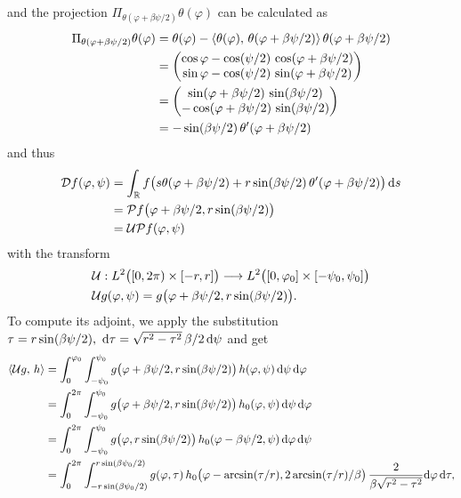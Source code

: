 \documentclass{amsart}
\renewcommand*{\phi}{\varphi}
\begin{document}
%
and the projection $\Pi_{\theta(\phi + \beta\psi/2)}\theta(\phi)$ can be calculated as
%
\begin{align*}
 \Pi_{\theta(\phi + \beta\psi/2)}\theta(\phi)
 &= \theta(\phi) - \INNER{\theta(\phi)}{\theta(\phi + \beta\psi/2)}\, \theta(\phi + \beta\psi/2) \\
 &=
 \begin{pmatrix}
  \cos\phi - \cos(\psi/2)\, \cos(\phi + \beta\psi/2) \\
  \sin\phi - \cos(\psi/2)\, \sin(\phi + \beta\psi/2)
 \end{pmatrix} \\
 &=
 \begin{pmatrix}
  \sin(\phi + \beta\psi/2)\, \sin(\beta\psi/2) \\
  -\cos(\phi + \beta\psi/2)\, \sin(\beta\psi/2)
 \end{pmatrix} \\
 &= -\sin(\beta\psi/2)\, \theta'(\phi + \beta\psi/2)
\end{align*}
%
and thus 
%
\begin{align*}
 \OPD f(\phi, \psi)
 &= \int_\RR f\big(s \theta(\phi + \beta\psi/2) + r \sin(\beta\psi/2)\, \theta'(\phi + \beta\psi/2) \big)\, \D s \\
 &= \OPP f\big(\phi + \beta\psi/2, r\sin(\beta\psi/2)\big) \\
 &= \OPU \OPP f(\phi, \psi)
\end{align*}
%
with the transform
%
\begin{align}
 &\OPU: L^2\big([0,2\pi) \times [-r,r]\big) \Lto L^2\big([0,\phi_0] \times [-\psi_0,\psi_0]\big) \notag \\
 \label{eq:fancurved:unit_trafo}
 &\OPU g(\phi, \psi) = g\big(\phi + \beta\psi/2, r\sin(\beta\psi/2)\big).
\end{align} 
%
To compute its adjoint, we apply the substitution $\tau = r\sin(\beta\psi/2),\ \mathrm{d}\tau = \sqrt{r^2-\tau^2}\, \beta/2\, \mathrm{d} \psi$ and get
%
\begin{align*}
 \INNER{\OPU g}{h} 
 &= \int_0^{\phi_0} \int_{-\psi_0}^{\psi_0} g\big(\phi + \beta\psi/2, r\sin(\beta\psi/2)\big)\, h(\phi, \psi)\, \D\psi\, \D\phi \\
 &= \int_0^{2\pi} \int_{-\psi_0}^{\psi_0} g\big(\phi + \beta\psi/2, r\sin(\beta\psi/2)\big)\, h_0(\phi, \psi)\, \D\psi\, \D\phi \\
 &= \int_0^{2\pi} \int_{-\psi_0}^{\psi_0} g\big(\phi, r\sin(\beta\psi/2)\big)\, h_0(\phi - \beta\psi/2, \psi)\, \D\phi\, \D\psi \\
 &= \int_0^{2\pi} \int_{-r\sin(\beta\psi_0/2)}^{r\sin(\beta\psi_0/2)} g(\phi, \tau)\, h_0\big(\phi - \arcsin(\tau/r), 
 2\arcsin(\tau/r)/\beta\big)\, \frac{2}{\beta\sqrt{r^2-\tau^2}} \D\phi\, \D\tau,
\end{align*}
\end{document}
